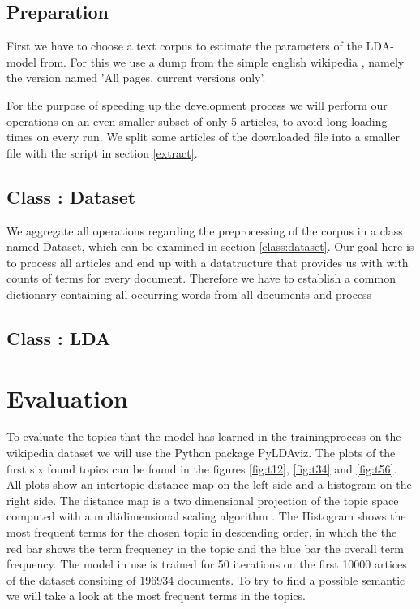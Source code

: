 \documentclass[12 pt,twopage]{article}
\begin{document}
\subsection{Preparation}
First we have to choose a text corpus to estimate the parameters of the LDA-model from. For this we use a dump from the simple english wikipedia \cite{simplewi84:online}, namely the version named 'All pages, current versions only'.

For the purpose of speeding up the development process we will perform our operations on an even smaller subset of only 5 articles, to avoid long loading times on every run. We split some articles of the downloaded file into a smaller file with the script in section \ref{extract}.

\subsection{Class : Dataset}
We aggregate all operations regarding the preprocessing of the corpus in a class named Dataset, which can be examined in section  \ref{class:dataset}. Our goal here is to process all articles and end up with a datatructure that provides us with with counts of terms for every document. Therefore we have to establish a common dictionary containing all occurring words from all documents and process

\subsection{Class : LDA}

\section{Evaluation}
To evaluate the topics that the model has learned in the trainingprocess on the wikipedia dataset we will use the Python package PyLDAviz. The plots of the first six found topics can be found in the figures \ref{fig:t12}, \ref{fig:t34} and \ref{fig:t56}. All plots show an intertopic distance map on the left side and a histogram on the right side. The distance map is a two dimensional projection of the topic space computed with a multidimensional scaling algorithm \cite{Sievert2014}. The Histogram shows the most frequent terms for the chosen topic in descending order, in which the the red bar shows the term frequency in the topic and the blue bar the overall term frequency.
The model in use is trained for 50 iterations on the first 10000 artices of the dataset consiting of \( 196934 \) documents.
\bigbreak
To try to find a possible semantic we will take a look at the most frequent terms in the topics.
\end{document}
